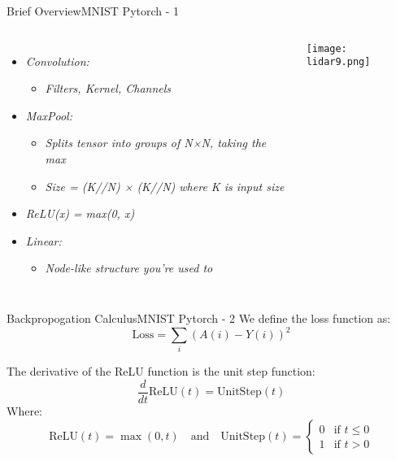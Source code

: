 \documentclass{beamer}
\begin{document}
\begin{frame}{Brief Overview}{MNIST Pytorch - 1}
\begin{columns}
\begin{itemize}
    \item \textit{Convolution:}
    \begin{itemize}
        \item \textit{Filters, Kernel, Channels}
    \end{itemize}

    \item \textit{MaxPool:}
    \begin{itemize}
        \item \textit{Splits tensor into groups of N×N, taking the max}
        \item \textit{Size = (K//N) × (K//N) where K is input size}
    \end{itemize}

    \item \textit{ReLU(x) = max(0, x)}
    
    \item \textit{Linear:}
    \begin{itemize}
        \item \textit{Node-like structure you're used to}
    \end{itemize}
\end{itemize}


\centering
\texttt{[image: lidar9.png]}

\end{columns}
\end{frame}




\begin{frame}{Backpropogation Calculus}{MNIST Pytorch - 2}
    We define the loss function as:
        \[ \text{Loss} = \sum_i (A(i) - Y(i))^2 \]
    
    The derivative of the ReLU function is the unit step function:
    \[ \frac{d}{dt} \text{ReLU}(t) = \text{UnitStep}(t) \]
    Where: \[ \text{ReLU}(t) = \max(0, t) 
        \quad \text{and} \quad
        \text{UnitStep}(t) =
        \begin{cases}
            0 & \text{if } t \leq 0 \\
            1 & \text{if } t > 0
        \end{cases}
    \]
\end{frame}
\end{document}
